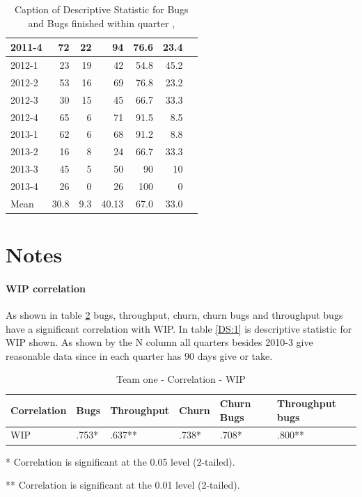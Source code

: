 \documentclass[UKenglish]{ifimaster}  %
\begin{document}
\begin{table}[!htbp]
\begin{adjustwidth}{-2.5cm}{}
{{\begin{tabular}{ | l | r | r | r | r | r | r | }
2011-4 & 72 & 22 & 94 & 76.6& 23.4 \\ \hline
2012-1 & 23 & 19 & 42 & 54.8 & 45.2 \\ \hline
2012-2 & 53 & 16 & 69 & 76.8 & 23.2 \\ \hline
2012-3 & 30 & 15 & 45 & 66.7 & 33.3\\ \hline
2012-4 & 65 & 6 & 71 & 91.5 & 8.5 \\ \hline
2013-1 & 62 & 6 & 68 & 91.2 & 8.8 \\ \hline
2013-2 & 16 & 8 & 24 & 66.7 & 33.3 \\ \hline
2013-3 & 45 & 5 & 50 & 90 & 10 \\ \hline
2013-4 & 26 & 0 & 26 & 100 & 0 \\ \hline
Mean & 30.8&9.3&40.13&67.0&33.0 \\ \hline

\end{tabular}
}
}
\end{adjustwidth}
\caption[Optional caption for list of figures]{Caption of Descriptive Statistic for Bugs and Bugs finished within quarter  , }
\label{DS:10:5} %
\end{table}
 
 
 

\newpage
\part{Notes}



\subsection{WIP correlation}
\label{sec:WIPC}
As shown in table \ref{corr:1} bugs, throughput, churn, churn bugs and throughput bugs have a significant correlation with WIP. In table \ref{DS:1} is descriptive statistic for WIP shown.  As shown by the N column all quarters besides 2010-3 give reasonable data since in each quarter has 90 days give or take. 

\begin{table}[!htbp] 
 \centering 
 \begin{tabular}{|l|l|l|l|l|l|} 
\hline 
Correlation  & Bugs & Throughput & Churn & Churn Bugs & Throughput bugs \\ \hline 
	WIP & .753* & .637** & .738* & .708* & .800** \\ \hline 
\end{tabular} 
 \caption{Team one - Correlation - 	WIP} 
 \label{corr:1}
    \centerline {* Correlation is significant at the 0.05 level (2-tailed).}
      \centerline{  ** Correlation is significant at the 0.01 level (2-tailed).}
 \end{table}  
 
\end{document}
